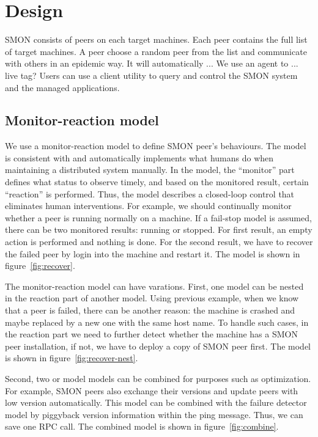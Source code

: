 \section{Design}
\label{sec:design}

SMON consists of peers on each target machines. Each peer
contains the full list of target machines. A peer choose a
random peer from the list and communicate with others in an
epidemic way. It will automatically ... We use an agent to
... live tag? Users can use a client utility to query and
control the SMON system and the managed applications.


\subsection{Monitor-reaction model}


We use a monitor-reaction model to define SMON peer's
behaviours.  The model is consistent with and automatically
implements what humans do when maintaining a distributed
system manually. In the model, the ``monitor'' part defines
what status to observe timely, and based on the monitored
result, certain ``reaction'' is performed. Thus, the model
describes a closed-loop control that eliminates human
interventions.  For example, we should continually monitor
whether a peer is running normally on a machine. If a
fail-stop model is assumed, there can be two monitored
results: running or stopped. For first result, an empty
action is performed and nothing is done. For the second
result, we have to recover the failed peer by login into the
machine and restart it.  The model is shown in
figure~\ref{fig:recover}.

The monitor-reaction model can have varations. First, one
model can be nested in the reaction part of another model.
Using previous example, when we know that a peer is failed,
there can be another reason: the machine is crashed and
maybe replaced by a new one with the same host name. To
handle such cases, in the reaction part we need to further
detect whether the machine has a SMON peer installation, if
not, we have to deploy a copy of SMON peer first. The model
is shown in figure~\ref{fig:recover-nest}.

Second, two or model models can be combined for purposes
such as optimization. For example, SMON peers also exchange
their versions and update peers with low version
automatically. This model can be combined with the failure
detector model by piggyback version information within the
ping message. Thus, we can save one RPC call.  The combined
model is shown in figure~\ref{fig:combine}.

